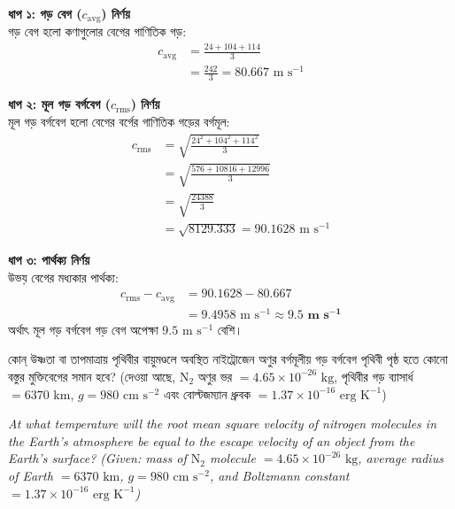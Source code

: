 \documentclass[12pt, a4paper]{article}
\begin{document}
\begin{tcolorbox}[solutionbox={সমাধান (Solution)}]
    \noindent
    \textbf{ধাপ ১: গড় বেগ ($c_{\text{avg}}$) নির্ণয়} \\
    গড় বেগ হলো কণাগুলোর বেগের গাণিতিক গড়:
    \begin{align*}
        c_{\text{avg}} &= \frac{24 + 104 + 114}{3} \\
        &= \frac{242}{3} = 80.667\text{ m s}^{-1}
    \end{align*}
    
    \vspace{0.4em}
    \noindent\textbf{ধাপ ২: মূল গড় বর্গবেগ ($c_{\text{rms}}$) নির্ণয়} \\
    মূল গড় বর্গবেগ হলো বেগের বর্গের গাণিতিক গড়ের বর্গমূল:
    \begin{align*}
        c_{\text{rms}} &= \sqrt{\frac{24^2 + 104^2 + 114^2}{3}} \\
        &= \sqrt{\frac{576 + 10816 + 12996}{3}} \\
        &= \sqrt{\frac{24388}{3}} \\
        &= \sqrt{8129.333} = 90.1628\text{ m s}^{-1}
    \end{align*}
    
    \vspace{0.4em}
    \noindent\textbf{ধাপ ৩: পার্থক্য নির্ণয়} \\
    উভয় বেগের মধ্যকার পার্থক্য:
    \begin{align*}
        c_{\text{rms}} - c_{\text{avg}} &= 90.1628 - 80.667 \\
        &= 9.4958\text{ m s}^{-1} \approx \mathbf{9.5\text{ m s}^{-1}}
    \end{align*}
    অর্থাৎ মূল গড় বর্গবেগ গড় বেগ অপেক্ষা $9.5\text{ m s}^{-1}$ বেশি।
\end{tcolorbox}

\vspace{2em}

\begin{tcolorbox}[questionbox={প্রশ্ন (Question) 7}]
    \noindent
    কোন্ উষ্ণতা বা তাপমাত্রায় পৃথিবীর বায়ুমণ্ডলে অবস্থিত নাইট্রোজেন অণুর বর্গমূলীয় গড় বর্গবেগ পৃথিবী পৃষ্ঠ হতে কোনো বস্তুর মুক্তিবেগের সমান হবে? (দেওয়া আছে, $\text{N}_2$ অণুর ভর $= 4.65 \times 10^{-26}\text{ kg}$, পৃথিবীর গড় ব্যাসার্ধ $= 6370\text{ km}$, $g = 980\text{ cm s}^{-2}$ এবং বোল্টজম্যান ধ্রুবক $= 1.37 \times 10^{-16}\text{ erg K}^{-1}$)
    
    \vspace{0.8em}
    \begin{english}
    \noindent\textit{\color{darkgray}
    At what temperature will the root mean square velocity of nitrogen molecules in the Earth's atmosphere be equal to the escape velocity of an object from the Earth's surface? (Given: mass of $\text{N}_2$ molecule $= 4.65 \times 10^{-26}\text{ kg}$, average radius of Earth $= 6370\text{ km}$, $g = 980\text{ cm s}^{-2}$, and Boltzmann constant $= 1.37 \times 10^{-16}\text{ erg K}^{-1}$)
    }
    \end{english}
\end{tcolorbox}
\end{document}
